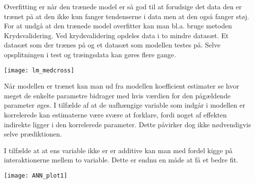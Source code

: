 \documentclass{report}
\begin{document}
Overfitting er når den trænede model er så god til at forudsige det data den er trænet på at den ikke kun fanger tendenserne i data men at den også fanger støj. For at undgå at den trænede model overfitter kan man bl.a. bruge metoden Krydsvalidering. Ved krydsvalidering opdeles data i to mindre datasæt. Et datasæt som der trænes på og et datasæt som modellen testes på. Selve opsplitningen i test og træingsdata kan gøres flere gange.

\texttt{[image: lm\_medcross]}

Når modellen er trænet kan man ud fra modellen koefficient estimater se hvor meget de enkelte parametre bidrager med hvis værdien for den pågældende parameter øges. 
I tilfælde af at de uafhængige variable som indgår i modellen er korrelerede kan estimaterne være svære at forklare, fordi noget af effekten indirekte ligger i den korrelerede parameter. Dette påvirker dog ikke nødvendigvis selve prædiktionen. 

I tilfælde at at ens variable ikke er er additive kan man med fordel kigge på interaktionerne mellem to variable. Dette er endnu en måde at få et bedre fit.

\texttt{[image: ANN\_plot1]}
\end{document}
